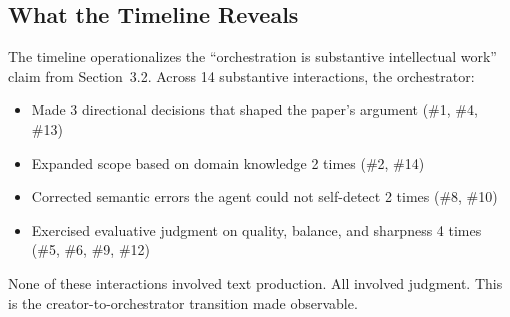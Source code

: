 \subsection{What the Timeline Reveals}

The timeline operationalizes the ``orchestration is substantive intellectual work'' claim from Section~3.2. Across 14 substantive interactions, the orchestrator:
\begin{itemize}[nosep]
    \item Made 3 directional decisions that shaped the paper's argument (\#1, \#4, \#13)
    \item Expanded scope based on domain knowledge 2 times (\#2, \#14)
    \item Corrected semantic errors the agent could not self-detect 2 times (\#8, \#10)
    \item Exercised evaluative judgment on quality, balance, and sharpness 4 times (\#5, \#6, \#9, \#12)
\end{itemize}

\noindent None of these interactions involved text production. All involved judgment. This is the creator-to-orchestrator transition made observable.

